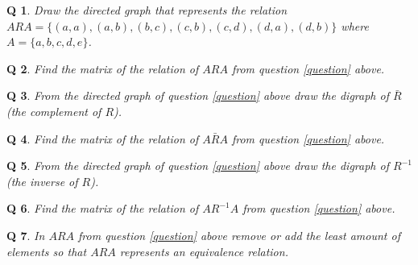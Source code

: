 \documentclass[12pt]{article}
\newtheorem{q} {Q}
\newcommand{\eqq}{\end{q}\newpage}
\begin{document}
\begin{q}{\label{question}} Draw the directed graph that represents the relation $ARA=\{( a, a), ( a, b), ( b, c), ( c, b), ( c, d), ( d, a), ( d, b)\} $ where $A=\{a, b,c,d,e\} $.\eqq
\begin{q} Find the matrix of the relation of $ARA$  from question {\ref{question}} above.\eqq
\begin{q} From the directed graph of  question {\ref{question}} above draw the digraph of $\bar{R}$ (the complement of $R$).\eqq
\begin{q} Find the matrix of the relation of $A{\bar R}A$  from question {\ref{question}} above.\eqq
\begin{q} From the directed graph of question {\ref{question}} above draw the digraph of $R^{-1}$ (the inverse of $R$).\eqq
\begin{q} Find the matrix of the relation of $AR^{-1}A$  from question {\ref{question}} above.\eqq
\begin{q} In $ARA$ from question {\ref{question}} above remove or add the least amount of  elements so that $ARA$ represents an equivalence relation.\eqq
\end{document}
